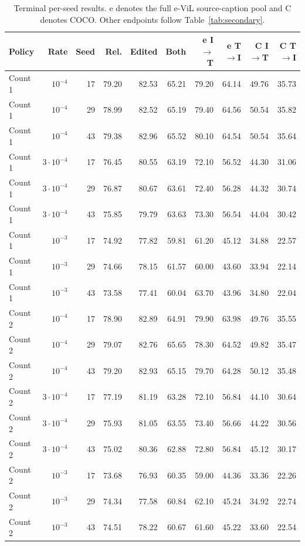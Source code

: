 \begin{table}[t]
\nolinenumbers
\centering
\small
\setlength{\tabcolsep}{3pt}
\begin{tabular}{lrrrrrrrrr}
\toprule
Policy & Rate & Seed & Rel. & Edited & Both & e I$\to$T & e T$\to$I & C I$\to$T & C T$\to$I\\
\midrule
Count 1 & $10^{-4}$ & 17 & 79.20 & 82.53 & 65.21 & 79.20 & 64.14 & 49.76 & 35.73\\
Count 1 & $10^{-4}$ & 29 & 78.99 & 82.52 & 65.19 & 79.40 & 64.56 & 50.54 & 35.82\\
Count 1 & $10^{-4}$ & 43 & 79.38 & 82.96 & 65.52 & 80.10 & 64.54 & 50.54 & 35.64\\
Count 1 & $3\cdot10^{-4}$ & 17 & 76.45 & 80.55 & 63.19 & 72.10 & 56.52 & 44.30 & 31.06\\
Count 1 & $3\cdot10^{-4}$ & 29 & 76.87 & 80.67 & 63.61 & 72.40 & 56.28 & 44.32 & 30.74\\
Count 1 & $3\cdot10^{-4}$ & 43 & 75.85 & 79.79 & 63.63 & 73.30 & 56.54 & 44.04 & 30.42\\
Count 1 & $10^{-3}$ & 17 & 74.92 & 77.82 & 59.81 & 61.20 & 45.12 & 34.88 & 22.57\\
Count 1 & $10^{-3}$ & 29 & 74.66 & 78.15 & 61.57 & 60.00 & 43.60 & 33.94 & 22.14\\
Count 1 & $10^{-3}$ & 43 & 73.58 & 77.41 & 60.04 & 63.70 & 43.96 & 34.80 & 22.04\\
Count 2 & $10^{-4}$ & 17 & 78.90 & 82.89 & 64.91 & 79.90 & 63.98 & 49.76 & 35.55\\
Count 2 & $10^{-4}$ & 29 & 79.07 & 82.76 & 65.65 & 78.30 & 64.52 & 49.82 & 35.47\\
Count 2 & $10^{-4}$ & 43 & 79.20 & 82.93 & 65.15 & 79.70 & 64.28 & 50.12 & 35.48\\
Count 2 & $3\cdot10^{-4}$ & 17 & 77.19 & 81.19 & 63.28 & 72.10 & 56.84 & 44.10 & 30.64\\
Count 2 & $3\cdot10^{-4}$ & 29 & 75.93 & 81.05 & 63.55 & 73.40 & 56.66 & 44.22 & 30.56\\
Count 2 & $3\cdot10^{-4}$ & 43 & 75.02 & 80.36 & 62.88 & 72.80 & 56.84 & 45.12 & 30.17\\
Count 2 & $10^{-3}$ & 17 & 73.68 & 76.93 & 60.35 & 59.00 & 44.36 & 33.36 & 22.26\\
Count 2 & $10^{-3}$ & 29 & 74.34 & 77.58 & 60.84 & 62.10 & 45.24 & 34.92 & 22.74\\
Count 2 & $10^{-3}$ & 43 & 74.51 & 78.22 & 60.67 & 61.60 & 45.22 & 33.60 & 22.54\\
\bottomrule
\end{tabular}
\caption{Terminal per-seed results. e denotes the full e-ViL source-caption pool and C denotes COCO. Other endpoints follow Table~\ref{tab:secondary}.}\label{tab:futerm1}
\end{table}
